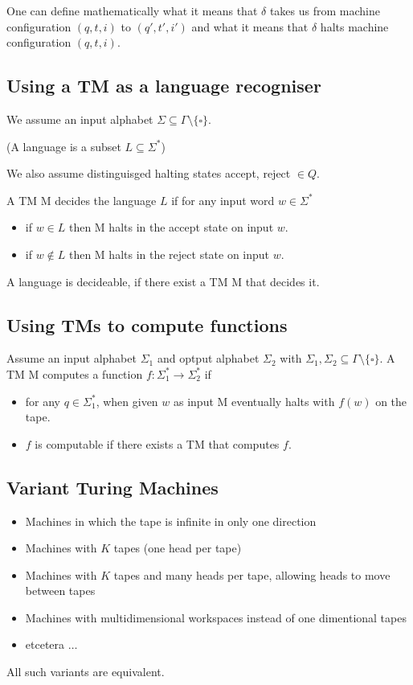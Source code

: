 \documentclass[a4paper,12pt]{article}
\theoremstyle{definition}
\theoremstyle{remark}
\begin{document}
One can define mathematically what it means that $\delta$ takes us from machine configuration $(q, t, i)$ to $(q', t', i')$ and
what it means that $\delta$ halts machine configuration $(q, t, i)$.

\subsection{Using a TM as a language recogniser}
We assume an input alphabet $\Sigma \subseteq \Gamma \setminus \{\square\}$.

(A language is a subset $L \subseteq \Sigma^*$)

We also assume distinguisged halting states accept, reject $\in Q$.

A TM M decides the language $L$ if for any input word $w \in \Sigma^*$
\begin{itemize}
    \item if $w \in L$ then M halts in the accept state on input $w$.
    \item if $w \notin L$ then M halts in the reject state on input $w$.
\end{itemize}

A language is decideable, if there exist a TM M that decides it.

\subsection{Using TMs to compute functions}
Assume an input alphabet $\Sigma_1$ and optput alphabet $\Sigma_2$ with $\Sigma_1, \Sigma_2 \subseteq \Gamma \setminus \{\square\}$.
A TM M computes a function $f: \Sigma_1^* \to \Sigma_2^*$ if
\begin{itemize}
    \item for any $q \in \Sigma_1^*$, when given $w$ as input M eventually halts with $f(w)$ on the tape.
    \item $f$ is computable if there exists a TM that computes $f$.
\end{itemize}

\subsection{Variant Turing Machines}
\begin{itemize}
    \item Machines in which the tape is infinite in only one direction
    \item Machines with $K$ tapes (one head per tape)
    \item Machines with $K$ tapes and many heads per tape, allowing heads to move between tapes
    \item Machines with multidimensional workspaces instead of one dimentional tapes
    \item etcetera $\dots$
\end{itemize}
All such variants are equivalent.
\end{document}
